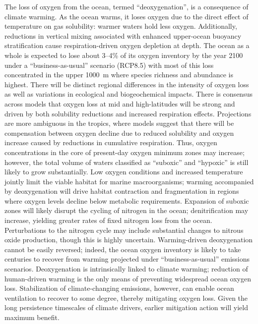 \documentclass{report_chapter}
\begin{document}
The loss of oxygen from the ocean, termed ``deoxygenation'', is a consequence of climate warming.
As the ocean warms, it loses oxygen due to the direct effect of temperature on gas solubility: warmer waters hold less oxygen.
Additionally, reductions in vertical mixing associated with enhanced upper-ocean buoyancy stratification cause respiration-driven oxygen depletion at depth.
The ocean as a whole is expected to lose about 3--4\% of its oxygen inventory by the year 2100 under a ``business-as-usual'' scenario (RCP8.5) with most of this loss concentrated in the upper 1000~m where species richness and abundance is highest.
There will be distinct regional differences in the intensity of oxygen loss as well as variations in ecological and biogeochemical impacts.
There is consensus across models that oxygen loss at mid and high-latitudes will be strong and driven by both solubility reductions and increased respiration effects.
Projections are more ambiguous in the tropics, where models suggest that there will be compensation between oxygen decline due to reduced solubility and oxygen increase caused by reductions in cumulative respiration.
Thus, oxygen concentrations in the core of present-day oxygen minimum zones may increase; however, the total volume of waters classified as ``suboxic'' and ``hypoxic'' is still likely to grow substantially.
Low oxygen conditions and increased temperature jointly limit the viable habitat for marine macroorganisms; warming accompanied by deoxygenation will drive habitat contraction and fragmentation in regions where oxygen levels decline below metabolic requirements.
Expansion of suboxic zones will likely disrupt the cycling of nitrogen in the ocean; denitrification may increase, yielding greater rates of fixed nitrogen loss from the ocean.
Perturbations to the nitrogen cycle may include substantial changes to nitrous oxide production, though this is highly uncertain.
Warming-driven deoxygenation cannot be easily reversed; indeed, the ocean oxygen inventory is likely to take centuries to recover from warming projected under ``business-as-usual'' emissions scenarios.
Deoxygenation is intrinsically linked to climate warming; reduction of human-driven warming is the only means of preventing widespread ocean oxygen loss.
Stabilization of climate-changing emissions, however, can enable ocean ventilation to recover to some degree, thereby mitigating oxygen loss.
Given the long persistence timescales of climate drivers, earlier mitigation action will yield maximum benefit.

\end{document}
